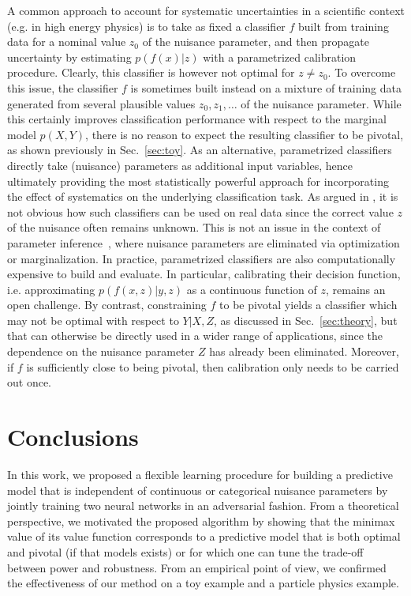 \documentclass{article}
\theoremstyle{plain}
\begin{document}
A common approach to account for systematic uncertainties in
a scientific context (e.g. in high energy physics)
is to take as fixed a classifier $f$ built from training data for a nominal
value $z_0$ of the nuisance parameter, and then propagate uncertainty by
estimating $p(f(x)|z)$ with a parametrized calibration procedure. Clearly, this
classifier is however not optimal for $z \neq z_0$. To overcome this issue, the
classifier $f$ is sometimes built instead on a mixture of training data
generated from several plausible values $z_0, z_1, \dots$ of the nuisance
parameter. While this certainly improves classification performance with respect
to the marginal model $p(X,Y)$, there is no reason to expect the resulting
classifier to be pivotal, as shown previously in Sec.~\ref{sec:toy}. As an
alternative, parametrized
classifiers~\citep{cranmer2015approximating,Baldi:2016fzo} directly take
(nuisance) parameters as additional input variables, hence ultimately providing
the most statistically powerful approach for incorporating the effect of
systematics on the underlying classification task.  As argued in
\citep{Neal:2007zz}, it is not obvious how such classifiers can be used on real
data since the correct value $z$ of the nuisance often remains unknown. This is
not an issue in the context of parameter
inference~\citep{cranmer2015approximating}, where nuisance parameters are
eliminated via optimization or marginalization. In practice, parametrized
classifiers  are also computationally expensive to build and evaluate. In
particular, calibrating their decision function, i.e. approximating
$p(f(x,z)|y,z)$ as a continuous function of $z$, remains an open challenge. By
contrast, constraining $f$ to be pivotal yields a classifier which may not be
optimal with respect to $Y|X,Z$, as discussed in Sec.~\ref{sec:theory}, but that
can otherwise be directly used in a wider range of applications, since the
dependence on the nuisance parameter $Z$ has already been eliminated. Moreover,
if $f$ is sufficiently close to being pivotal, then calibration only needs to be
carried out once.



\section{Conclusions}
\label{sec:conclusions}

In this work, we proposed a flexible learning procedure for building a
predictive model that is independent of continuous or categorical nuisance
parameters by jointly training two neural networks in an adversarial fashion.
From a theoretical perspective, we motivated the proposed algorithm by showing
that the minimax value  of its value function corresponds to a predictive model
that is both optimal and pivotal (if that models exists) or for which one can
tune the trade-off between power and robustness. From an empirical point of
view, we confirmed the effectiveness of our method on a toy example
and a particle physics example.
\end{document}
